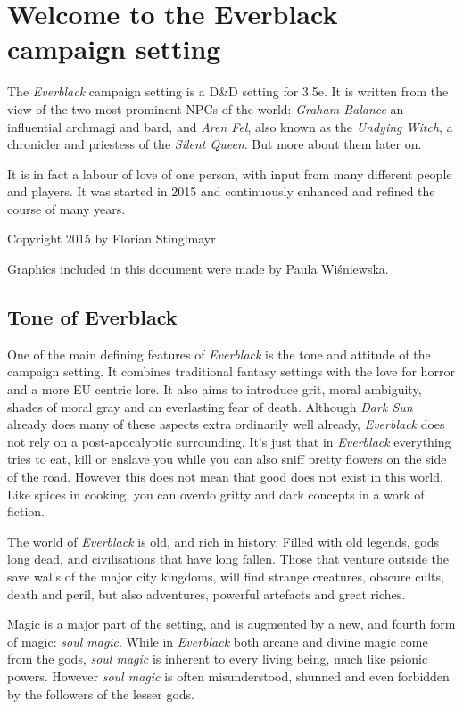 \twocolumn
\section{Welcome to the Everblack campaign setting}

The \emph{Everblack} campaign setting is a D\&D setting for 3.5e.  It is
written from the view of the two most prominent NPCs of the world:
\emph{Graham Balance} an influential archmagi and bard, and \emph{Aren Fel},
also known as the \emph{Undying Witch}, a chronicler and priestess of the
\emph{Silent Queen}. But more about them later on.

It is in fact a labour of love of one person, with input from many different
people and players. It was started in 2015 and continuously enhanced and
refined the course of many years.

Copyright 2015 by Florian Stinglmayr

Graphics included in this document were made by Paula Wiśniewska.

\subsection{Tone of Everblack}

One of the main defining features of \emph{Everblack} is the tone and attitude
of the campaign setting. It combines traditional fantasy settings with the love
for horror and a more EU centric lore. It also aims to introduce grit, moral
ambiguity, shades of moral gray and an everlasting fear of
death. Although \emph{Dark Sun} already does many of these aspects extra
ordinarily well already, \emph{Everblack} does not rely on a
post-apocalyptic surrounding. It's just that in \emph{Everblack} everything
tries to eat, kill or enslave you while you can also sniff pretty flowers on
the side of the road. However this does not mean that good does not exist in
this world. Like spices in cooking, you can overdo gritty and dark concepts in
a work of fiction.

The world of \emph{Everblack} is old, and rich in history. Filled with old
legends, gods long dead, and civilisations that have long fallen. Those that
venture outside the save walls of the major city kingdoms, will find strange
creatures, obscure cults, death and peril, but also adventures, powerful
artefacts and great riches.

Magic is a major part of the setting, and is augmented by a new, and fourth
form of magic: \emph{soul magic}. While in \emph{Everblack} both arcane and
divine magic come from the gods, \emph{soul magic} is inherent to every living
being, much like psionic powers. However \emph{soul magic} is often
misunderstood, shunned and even forbidden by the followers of the lesser gods.

